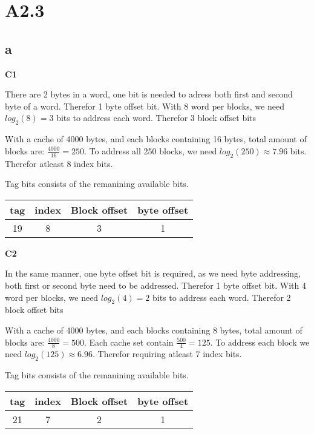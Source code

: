 \section*{A2.3}

\subsection*{a}
\textbf{C1}

There are 2 bytes in a word, one bit is needed to adress both first and second byte of a word. Therefor 1 byte offset bit.
With 8 word per blocks, we need $log_2(8) = 3$ bits to address each word. Therefor 3 block offset bits

With a cache of 4000 bytes, and each blocks containing 16 bytes, total amount of blocks are: $\frac{4000}{16} = 250$.
To address all 250 blocks, we need $log_2(250) \approx 7.96 $ bits. Therefor atleast 8 index bits.

Tag bits consists of the remanining available bits.

\begin{center}
    \begin{tabular}{c | c | c | c}
        tag & index  &  Block offset &  byte offset  \\
        \hline
        19 & 8 & 3 & 1  \\
    \end{tabular}
\end{center}


\textbf{C2}

In the same manner, one byte offset bit is required, as we need byte addressing, both first or second byte need to be addressed. Therefor 1 byte offset bit.
With 4 word per blocks, we need $log_2(4) = 2$ bits to address each word. Therefor 2 block offset bits

With a cache of 4000 bytes, and each blocks containing 8 bytes, total amount of blocks are: $\frac{4000}{8} = 500$.
Each cache set contain $\frac{500}{4} = 125$. To address each block we need $log_2(125) \approx 6.96$. Therefor requiring atleast 7 index bits.

Tag bits consists of the remanining available bits.

\begin{center}
    \begin{tabular}{c | c | c | c}
        tag & index  &  Block offset &  byte offset  \\
        \hline
        21 & 7 & 2 & 1  \\
    \end{tabular}
\end{center}

